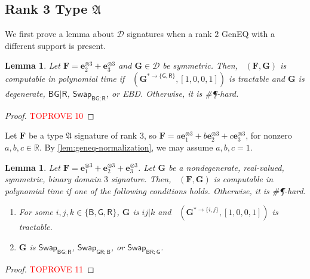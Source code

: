\documentclass[11pt]{article}
\newtheorem{lemma}[theorem]{Lemma}
\DeclareMathOperator{\holbs}{Holant^*_2}
\DeclareMathOperator{\holts}{Holant^*_3}
\newcommand{\db}{\mathsf{B}}
\newcommand{\dg}{\mathsf{G}}
\newcommand{\dr}{\mathsf{R}}
\newcommand{\geneq}{\textsf{GenEQ}\xspace}
\newcommand{\swhelper}[1]{$\mathsf{Swap}_{#1}$\xspace}
\newcommand{\swbg}{\swhelper{\db \dg; \dr}}
\newcommand{\swbr}{\swhelper{\db \dr; \dg}}
\newcommand{\swgr}{\swhelper{\dg \dr; \db}}
\newcommand{\sph}{\#\P-hard\xspace}
\newcommand{\teh}{^{\otimes 3}}
\newcommand{\domres}[1]{
  ^{*\to\{#1\}}
}
\newcommand{\strspt}{\textsf{EBD}\xspace}
\newcommand{\ternarytractgeneq}{$\mathfrak{A}$\xspace}
\begin{document}
\subsection{Rank 3 Type \texorpdfstring{\ternarytractgeneq}{A}}
We first prove a lemma about $\mathcal{D}$ signatures when a rank $2$ \geneq with a different support is present.
\begin{lemma}\label{lem:gr-equality-D-dichotomy}
  Let $\mathbf{F} = \mathbf{e}_2 \teh + \mathbf{e}_3 \teh$ and $\mathbf{G} \in \mathcal{D}$ be symmetric.
  Then, $\holts(\mathbf{F}, \mathbf{G})$ is computable in polynomial time if $\holbs(\mathbf{G}\domres{\dg, \dr}, [1, 0, 0, 1])$ is tractable and $\mathbf{G}$ is degenerate, $\db \dg | \dr$, \swbg, or \strspt.
  Otherwise, it is \sph.
\end{lemma}
\begin{proof}\textcolor{red}{TOPROVE 10}\end{proof}

Let $\mathbf{F}$ be a type \ternarytractgeneq signature of rank $3$, so $\mathbf{F} = a \mathbf{e}_1 \teh + b \mathbf{e}_2 \teh + c \mathbf{e}_3\teh$, for nonzero $a, b, c \in \mathbb{R}$.
By \cref{lem:geneq-normalization}, we may assume $a, b, c = 1$.
\begin{lemma}\label{lem:dichotomy-single-ternary-rank-3-geneq-single-binary}
  Let $\mathbf{F} = \mathbf{e}_1 \teh + \mathbf{e}_2 \teh + \mathbf{e}_3 \teh$.
  Let $\mathbf{G}$ be a nondegenerate, real-valued, symmetric, binary domain $3$ signature.
  Then, $\holts(\mathbf{F}, \mathbf{G})$ is computable in polynomial time if one of the following conditions holds. Otherwise, it is \sph.
  \begin{enumerate}
    \item For some $i, j, k \in \{\db, \dg, \dr\}$, $\mathbf{G}$ is $ij | k$ and $\holbs(\mathbf{G}\domres{i, j}, [1, 0, 0, 1])$ is tractable.
    \item $\mathbf{G}$ is \swbg, \swgr, or \swbr.
  \end{enumerate}
\end{lemma}
\begin{proof}\textcolor{red}{TOPROVE 11}\end{proof}
\end{document}
